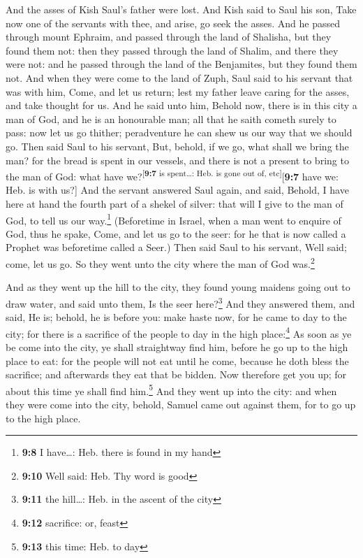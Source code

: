  And the asses of Kish Saul's father were lost. And Kish
said to Saul his son, Take now one of the servants with thee, and arise,
go seek the asses.  And he passed through mount Ephraim,
and passed through the land of Shalisha, but they found them not: then
they passed through the land of Shalim, and there they were not: and he
passed through the land of the Benjamites, but they found them not.
 And when they were come to the land of Zuph, Saul said to
his servant that was with him, Come, and let us return; lest my father
leave caring for the asses, and take thought for us.  And
he said unto him, Behold now, there is in this city a man of God, and he
is an honourable man; all that he saith cometh surely to pass: now let
us go thither; peradventure he can shew us our way that we should go.
 Then said Saul to his servant, But, behold, if we go,
what shall we bring the man? for the bread is spent in our vessels, and
there is not a present to bring to the man of God: what have
we?\textsuperscript{{[}\textbf{9:7} is spent\ldots: Heb. is gone out of,
etc{]}}{[}\textbf{9:7} have we: Heb. is with us?{]}  And
the servant answered Saul again, and said, Behold, I have here at hand
the fourth part of a shekel of silver: that will I give to the man of
God, to tell us our way.\footnote{\textbf{9:8} I have\ldots: Heb. there
  is found in my hand}  (Beforetime in Israel, when a man
went to enquire of God, thus he spake, Come, and let us go to the seer:
for he that is now called a Prophet was beforetime called a Seer.)
 Then said Saul to his servant, Well said; come, let us
go. So they went unto the city where the man of God was.\footnote{\textbf{9:10}
  Well said: Heb. Thy word is good}

 And as they went up the hill to the city, they found
young maidens going out to draw water, and said unto them, Is the seer
here?\footnote{\textbf{9:11} the hill\ldots: Heb. in the ascent of the
  city}  And they answered them, and said, He is; behold,
he is before you: make haste now, for he came to day to the city; for
there is a sacrifice of the people to day in the high place:\footnote{\textbf{9:12}
  sacrifice: or, feast}  As soon as ye be come into the
city, ye shall straightway find him, before he go up to the high place
to eat: for the people will not eat until he come, because he doth bless
the sacrifice; and afterwards they eat that be bidden. Now therefore get
you up; for about this time ye shall find him.\footnote{\textbf{9:13}
  this time: Heb. to day}  And they went up into the
city: and when they were come into the city, behold, Samuel came out
against them, for to go up to the high place.

